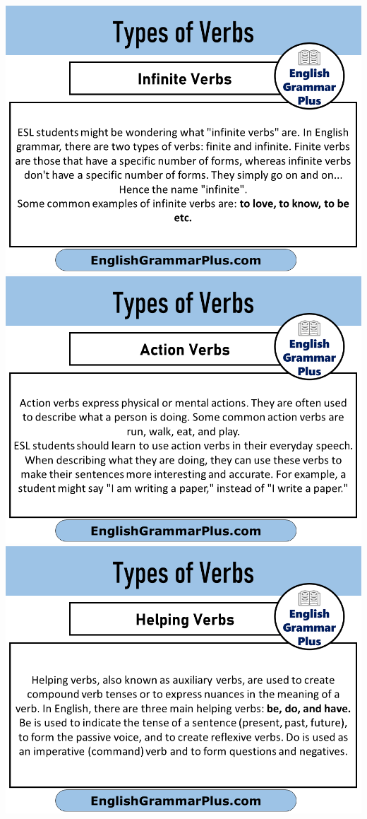 \includegraphics[scale=0.25]{infiniteVerbs.png}
\includegraphics[scale=0.25]{actionVerbs.png}
\includegraphics[scale=0.25]{helpingVerbs.png}
